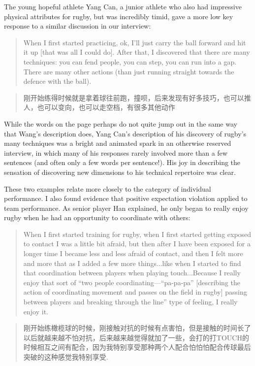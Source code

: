 \begin{CJK}{UTF8}{gbsn}
The young hopeful athlete Yang Can, a junior athlete who also had impressive physical attributes for rugby, but was incredibly timid, gave a more low key response to a similar discussion in our interview:

    \begin{quote}
      When I first started practicing, ok, I'll just carry the ball forward and hit it up [that was all I could do]. After that, I discovered that there are many techniques: you can fend people, you can step, you can run into a gap. There are many other actions (than just running straight towards the defence with the ball).
    \end{quote}

    \begin{quote}
      刚开始练得时候就是拿着球往前跑，撞呗，后来发现有好多技巧，也可以推人，也可以变向，也可以走空档，有很多其他动作
    \end{quote}

While the words on the page perhaps do not quite jump out in the same way that Wang's description does, Yang Can's description of his discovery of rugby's many techniques was a bright and animated spark in an otherwise reserved interview, in which many of his responses rarely involved more than a few sentences (and often only a few words per sentence!).  His joy in describing the sensation of discovering new dimensions to his technical repertoire was clear.

These two examples relate more closely to the category of individual performance.  I also found evidence that positive expectation violation applied to team performance.  As senior player Han explained, he only began to really enjoy rugby when he had an opportunity to coordinate with others:

\begin{quote}
    When I first started training for rugby, when I first started getting exposed to contact I was a little bit afraid, but then after I have been exposed for a longer time I became less and less afraid of contact, and then I felt more and more that as I added a few more things...like when I started to find that coordination between players when playing touch...Because I really enjoy that sort of ``two people coordinating---``pa-pa-pa'' [describing the action of coordinating movement and passes on the field in rugby] passing between players and breaking through the line'' type of feeling, I really enjoy it.
\end{quote}

\begin{quote}
      刚开始练橄榄球的时候，刚接触对抗的时候有点害怕，但是接触的时间长了以后就越来越不怕对抗，后来越来越觉得就加了一些，会打的打TOUCH的时候相互之间有配合，因为我特别享受那种两个人配合怕怕怕配合传球最后突破的这种感觉我特别享受.
\end{quote}


\end{CJK}
